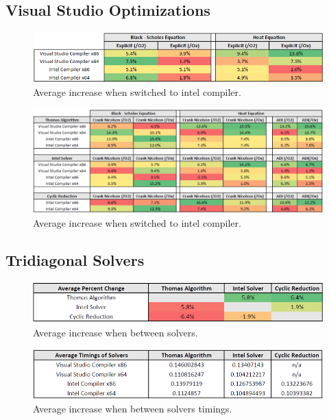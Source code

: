 \documentclass[12pt, oneside]{book}
\theoremstyle{plain}
\theoremstyle{definition}
\begin{document}
\subsection{Visual Studio Optimizations}
\begin{figure}[!htb]
    \centering
        \includegraphics[scale=0.7]{expFlagPercent.png}
    \caption{Average increase when switched to intel compiler.}
\end{figure}
\begin{figure}[!htb]
    \centering
        \includegraphics[scale=0.6]{FlagPercent.png}
    \caption{Average increase when switched to intel compiler.}
\end{figure}


\subsection{Tridiagonal Solvers} 
 \begin{figure}[!htb]
    \centering
        \includegraphics[scale=0.7]{solverAveragePercentage.png}
    \caption{Average increase when between solvers.}
\end{figure}
\begin{figure}[!htb]
    \centering
        \includegraphics[scale=0.6]{solverAverage.png}
    \caption{Average increase when between solvers timings.}
\end{figure}
\end{document}
